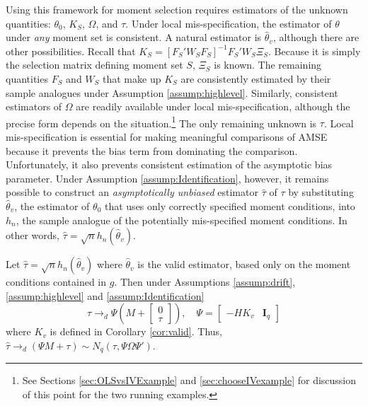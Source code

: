 Using this framework for moment selection requires estimators of the unknown quantities: $\theta_0$, $K_S$, $\Omega$, and $\tau$. 
Under local mis-specification, the estimator of $\theta$ under \emph{any} moment set is consistent. 
A natural estimator is $\widehat{\theta}_v$, although there are other possibilities. 
Recall that $K_S = [F_S'W_SF_S]^{-1} F_S'W_S \Xi_S$.
Because it is simply the selection matrix defining moment set $S$, $\Xi_S$ is known.  
The remaining quantities $F_S$ and $W_S$ that make up $K_S$ are consistently estimated by their sample analogues under Assumption \ref{assump:highlevel}.
Similarly, consistent estimators of $\Omega$ are readily available under local mis-specification, although the precise form depends on the situation.\footnote{See Sections \ref{sec:OLSvsIVExample} and \ref{sec:chooseIVexample} for discussion of this point for the two running examples.}
The only remaining unknown is $\tau$. Local mis-specification is essential for making meaningful comparisons of AMSE because it prevents the bias term from dominating the comparison. 
Unfortunately, it also prevents consistent estimation of the asymptotic bias parameter.
Under Assumption \ref{assump:Identification}, however, it remains possible to construct an \emph{asymptotically unbiased} estimator $\widehat{\tau}$ of $\tau$ by substituting $\widehat{\theta}_v$, the estimator of $\theta_0$ that uses only correctly specified moment conditions, into $h_n$, the sample analogue of the potentially mis-specified moment conditions. 
In other words,  $\widehat{\tau} = \sqrt{n} h_n(\widehat{\theta}_v)$. 

\begin{thm} 
\label{thm:tau}
Let $\widehat{\tau} = \sqrt{n} h_n(\widehat{\theta}_v)$ where $\widehat{\theta}_v$ is the valid estimator, based only on the moment conditions contained in $g$. 
Then under Assumptions \ref{assump:drift}, \ref{assump:highlevel} and \ref{assump:Identification}
$$\widehat{\tau} \rightarrow_d \Psi\left( M + \left[\begin{array}
	{c} 0 \\ \tau
\end{array} \right]\right), \quad \Psi = \left[\begin{array}{cc} -HK_v & \mathbf{I}_q \end{array}\right]$$ 
where $K_v$ is defined in Corollary \ref{cor:valid}.
Thus, $\widehat{\tau}\rightarrow_d (\Psi M + \tau) \sim N_q(\tau, \Psi \Omega \Psi')$.
\end{thm}

